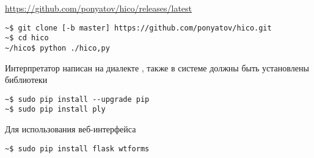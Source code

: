 \label{install}

\url{https://github.com/ponyatov/hico/releases/latest}

\begin{verbatim}
~$ git clone [-b master] https://github.com/ponyatov/hico.git
~$ cd hico
~/hico$ python ./hico,py
\end{verbatim}

Интерпретатор написан на диалекте , также в системе должны быть установлены
библиотеки

\begin{verbatim}
~$ sudo pip install --upgrade pip
~$ sudo pip install ply
\end{verbatim}

Для использования веб-интерфейса

\begin{verbatim}
~$ sudo pip install flask wtforms
\end{verbatim}


